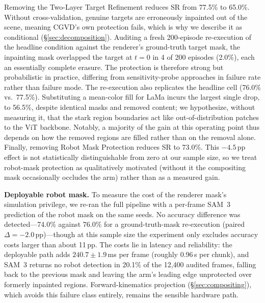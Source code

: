 \documentclass[letterpaper, 10 pt, conference]{ieeeconf}  %
\begin{document}
Removing the Two-Layer Target Refinement reduces SR from 77.5\% to 65.0\%. Without cross-validation, genuine targets are erroneously inpainted out of the scene, meaning CGVD's own protection fails, which is why we describe it as conditional (\S\ref{sec:decomposition}). Auditing a fresh 200-episode re-execution of the headline condition against the renderer's ground-truth target mask, the inpainting mask overlapped the target at $t{=}0$ in 4 of 200 episodes (2.0\%), each an essentially complete erasure. The protection is therefore strong but probabilistic in practice, differing from sensitivity-probe approaches in failure rate rather than failure mode. The re-execution also replicates the headline cell (76.0\% vs.\ 77.5\%). Substituting a mean-color fill for LaMa incurs the largest single drop, to 56.5\%, despite identical masks and removed content; we hypothesize, without measuring it, that the stark region boundaries act like out-of-distribution patches to the ViT backbone. Notably, a majority of the gain at this operating point thus depends on how the removed regions are filled rather than on the removal alone. Finally, removing Robot Mask Protection reduces SR to 73.0\%. This $-4.5$\,pp effect is not statistically distinguishable from zero at our sample size, so we treat robot-mask protection as qualitatively motivated (without it the compositing mask occasionally occludes the arm) rather than as a measured gain.

\textbf{Deployable robot mask.} To measure the cost of the renderer mask's simulation privilege, we re-ran the full pipeline with a per-frame SAM~3 prediction of the robot mask on the same seeds. No accuracy difference was detected---74.0\% against 76.0\% for a ground-truth-mask re-execution (paired $\Delta = -2.0$\,pp)---though at this sample size the experiment only excludes accuracy costs larger than about 11\,pp. The costs lie in latency and reliability: the deployable path adds $240.7 \pm 1.9$\,ms per frame (roughly 0.96\,s per chunk), and SAM~3 returns no robot detection in 20.1\% of the 12,400 audited frames, falling back to the previous mask and leaving the arm's leading edge unprotected over formerly inpainted regions. Forward-kinematics projection (\S\ref{sec:compositing}), which avoids this failure class entirely, remains the sensible hardware path.
\end{document}
